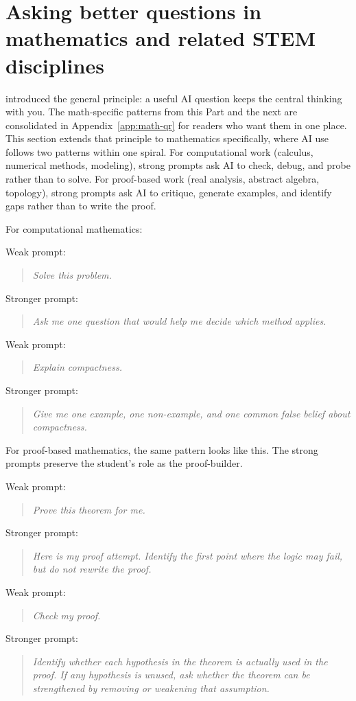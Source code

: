 \documentclass{SIAMbook2023}
\newcommand{\studentprompt}[1]{\begin{quote}\small\itshape #1\end{quote}}
\begin{document}
\section{Asking better questions in mathematics and related STEM disciplines}
\label{sec:better-questions}%

 introduced the general principle: a useful AI question keeps the central thinking with you. The math-specific patterns from this Part and the next are consolidated in Appendix~\ref{app:math-qr} for readers who want them in one place. This section extends that principle to mathematics specifically, where AI use follows two patterns within one spiral. For computational work (calculus, numerical methods, modeling), strong prompts ask AI to check, debug, and probe rather than to solve. For proof-based work (real analysis, abstract algebra, topology), strong prompts ask AI to critique, generate examples, and identify gaps rather than to write the proof.

For computational mathematics:

Weak prompt:

\studentprompt{Solve this problem.}

Stronger prompt:

\studentprompt{Ask me one question that would help me decide which method applies.}

Weak prompt:

\studentprompt{Explain compactness.}

Stronger prompt:

\studentprompt{Give me one example, one non-example, and one common false belief about compactness.}

For proof-based mathematics, the same pattern looks like this. The strong prompts preserve the student's role as the proof-builder.

Weak prompt:

\studentprompt{Prove this theorem for me.}

Stronger prompt:

\studentprompt{Here is my proof attempt. Identify the first point where the logic may fail, but do not rewrite the proof.}

Weak prompt:

\studentprompt{Check my proof.}

Stronger prompt:

\studentprompt{Identify whether each hypothesis in the theorem is actually used in the proof. If any hypothesis is unused, ask whether the theorem can be strengthened by removing or weakening that assumption.}
\end{document}
